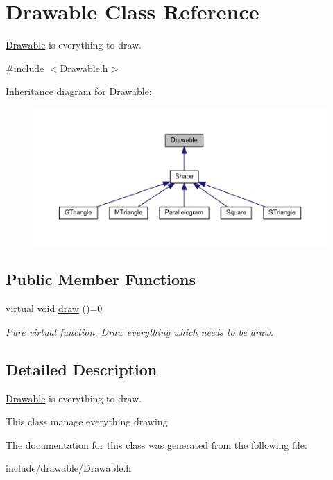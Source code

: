 \hypertarget{classDrawable}{}\section{Drawable Class Reference}
\label{classDrawable}


\hyperlink{classDrawable}{Drawable} is everything to draw.  




{\ttfamily \#include $<$Drawable.\+h$>$}



Inheritance diagram for Drawable\+:
\nopagebreak
\begin{figure}[H]
\begin{center}
\leavevmode
\includegraphics[width=350pt]{classDrawable__inherit__graph}
\end{center}
\end{figure}
\subsection*{Public Member Functions}
\begin{DoxyCompactItemize}
\item 
\mbox{\label{classDrawable_aa37d7b328240d343134adcfe5e4dcd38}} 
virtual void \hyperlink{classDrawable_aa37d7b328240d343134adcfe5e4dcd38}{draw} ()=0
\begin{DoxyCompactList}\small\item\em Pure virtual function. Draw everything which needs to be draw. \end{DoxyCompactList}\end{DoxyCompactItemize}


\subsection{Detailed Description}
\hyperlink{classDrawable}{Drawable} is everything to draw. 

This class manage everything drawing 

The documentation for this class was generated from the following file\+:\begin{DoxyCompactItemize}
\item 
include/drawable/Drawable.\+h\end{DoxyCompactItemize}
